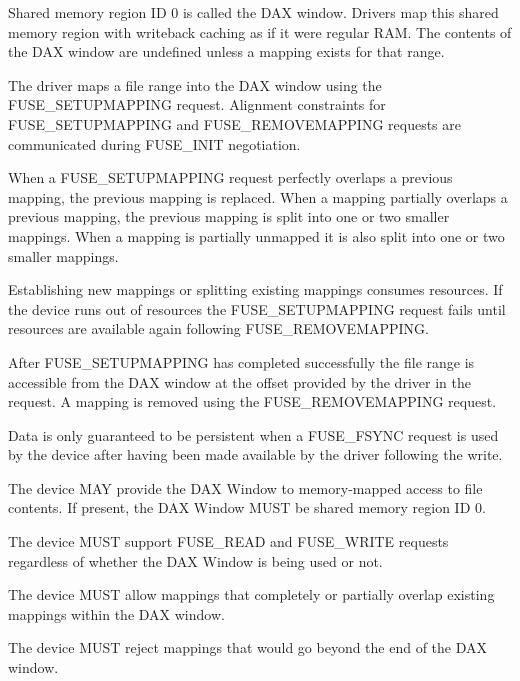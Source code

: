 Shared memory region ID 0 is called the DAX window.  Drivers map this shared
memory region with writeback caching as if it were regular RAM.  The contents
of the DAX window are undefined unless a mapping exists for that range.

The driver maps a file range into the DAX window using the FUSE\_SETUPMAPPING
request.  Alignment constraints for FUSE\_SETUPMAPPING and FUSE\_REMOVEMAPPING
requests are communicated during FUSE\_INIT negotiation.

When a FUSE\_SETUPMAPPING request perfectly overlaps a previous mapping, the
previous mapping is replaced.  When a mapping partially overlaps a previous
mapping, the previous mapping is split into one or two smaller mappings.  When
a mapping is partially unmapped it is also split into one or two smaller
mappings.

Establishing new mappings or splitting existing mappings consumes resources.
If the device runs out of resources the FUSE\_SETUPMAPPING request fails until
resources are available again following FUSE\_REMOVEMAPPING.

After FUSE\_SETUPMAPPING has completed successfully the file range is
accessible from the DAX window at the offset provided by the driver in the
request.  A mapping is removed using the FUSE\_REMOVEMAPPING request.

Data is only guaranteed to be persistent when a FUSE\_FSYNC request is used by
the device after having been made available by the driver following the write.


The device MAY provide the DAX Window to memory-mapped access to file contents.  If present, the DAX Window MUST be shared memory region ID 0.

The device MUST support FUSE\_READ and FUSE\_WRITE requests regardless of whether the DAX Window is being used or not.

The device MUST allow mappings that completely or partially overlap existing mappings within the DAX window.

The device MUST reject mappings that would go beyond the end of the DAX window.


